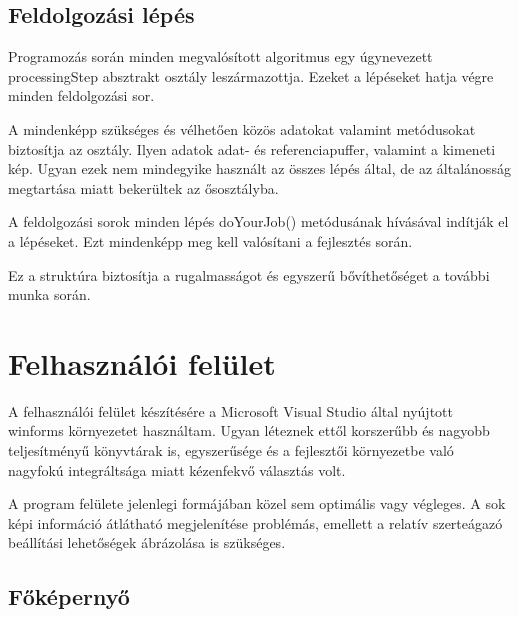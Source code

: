 \subsection{Feldolgozási lépés}\label{sect:processingStep}

Programozás során minden megvalósított algoritmus egy úgynevezett processingStep absztrakt osztály leszármazottja.
Ezeket a lépéseket hatja végre minden feldolgozási sor.

A mindenképp szükséges és vélhetően közös adatokat valamint metódusokat biztosítja az osztály.
Ilyen adatok adat- és referenciapuffer, valamint a kimeneti kép.
Ugyan ezek nem mindegyike használt az összes lépés által, de az általánosság megtartása miatt bekerültek az ősosztályba.

A feldolgozási sorok minden lépés doYourJob() metódusának hívásával indítják el a lépéseket.
Ezt mindenképp meg kell valósítani a fejlesztés során.

Ez a struktúra biztosítja a rugalmasságot és egyszerű bővíthetőséget a további munka során.

\section{Felhasználói felület}\label{sect:UserInterface}

A felhasználói felület készítésére a Microsoft Visual Studio által nyújtott winforms környezetet használtam.
Ugyan léteznek ettől korszerűbb és nagyobb teljesítményű könyvtárak is, egyszerűsége és a fejlesztői környezetbe való nagyfokú integráltsága miatt kézenfekvő választás volt.
 
A program felülete jelenlegi formájában közel sem optimális vagy végleges.
A sok képi információ átlátható megjelenítése problémás, emellett a relatív szerteágazó beállítási lehetőségek ábrázolása is szükséges.


\subsection{Főképernyő}\label{sect:mainView}

